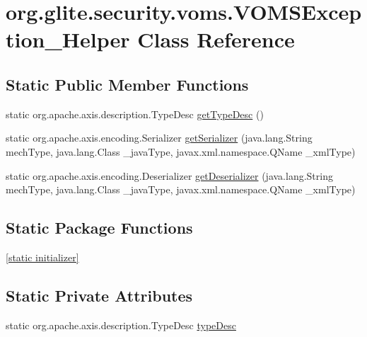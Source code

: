 \hypertarget{classorg_1_1glite_1_1security_1_1voms_1_1VOMSException__Helper}{
\section{org.glite.security.voms.VOMSException\_\-Helper Class Reference}
\label{classorg_1_1glite_1_1security_1_1voms_1_1VOMSException__Helper}
}
\subsection*{Static Public Member Functions}
\begin{DoxyCompactItemize}
\item 
static org.apache.axis.description.TypeDesc \hyperlink{classorg_1_1glite_1_1security_1_1voms_1_1VOMSException__Helper_a9412a5fc78b3b5753269f594ce0d2c87}{getTypeDesc} ()
\item 
static org.apache.axis.encoding.Serializer \hyperlink{classorg_1_1glite_1_1security_1_1voms_1_1VOMSException__Helper_a43243fa615cf0c2072c3db6fd44a3fe9}{getSerializer} (java.lang.String mechType, java.lang.Class \_\-javaType, javax.xml.namespace.QName \_\-xmlType)
\item 
static org.apache.axis.encoding.Deserializer \hyperlink{classorg_1_1glite_1_1security_1_1voms_1_1VOMSException__Helper_ab1a43d60da089d665abb9fb4a1eadc53}{getDeserializer} (java.lang.String mechType, java.lang.Class \_\-javaType, javax.xml.namespace.QName \_\-xmlType)
\end{DoxyCompactItemize}
\subsection*{Static Package Functions}
\begin{DoxyCompactItemize}
\item 
\hyperlink{classorg_1_1glite_1_1security_1_1voms_1_1VOMSException__Helper_a32c6547f8f66c59d379adb059140d77c}{\mbox{[}static initializer\mbox{]}}
\end{DoxyCompactItemize}
\subsection*{Static Private Attributes}
\begin{DoxyCompactItemize}
\item 
static org.apache.axis.description.TypeDesc \hyperlink{classorg_1_1glite_1_1security_1_1voms_1_1VOMSException__Helper_a5a4a12c43062ea03e2a3f8225cec5dd8}{typeDesc}
\end{DoxyCompactItemize}


